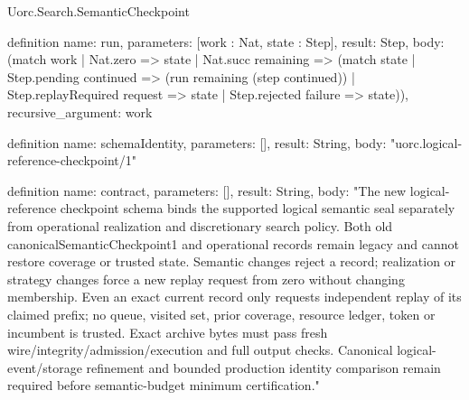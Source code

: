 \begin{lexlean}{Uorc.Search.SemanticCheckpoint}
\begin{semanticmodule}
definition{
  name: run,
  parameters: [work : Nat, state : Step],
  result: Step,
  body: (match work
    | Nat.zero => state
    | Nat.succ remaining => (match state
      | Step.pending continued => (run remaining (step continued))
      | Step.replayRequired request => state
      | Step.rejected failure => state)),
  recursive_argument: work
}

definition{
  name: schemaIdentity,
  parameters: [],
  result: String,
  body: "uorc.logical-reference-checkpoint/1"
}

definition{
  name: contract,
  parameters: [],
  result: String,
  body: "The new logical-reference checkpoint schema binds the supported logical semantic seal separately from operational realization and discretionary search policy. Both old canonicalSemanticCheckpoint1 and operational records remain legacy and cannot restore coverage or trusted state. Semantic changes reject a record; realization or strategy changes force a new replay request from zero without changing membership. Even an exact current record only requests independent replay of its claimed prefix; no queue, visited set, prior coverage, resource ledger, token or incumbent is trusted. Exact archive bytes must pass fresh wire/integrity/admission/execution and full output checks. Canonical logical-event/storage refinement and bounded production identity comparison remain required before semantic-budget minimum certification."
}
\end{semanticmodule}
\end{lexlean}
